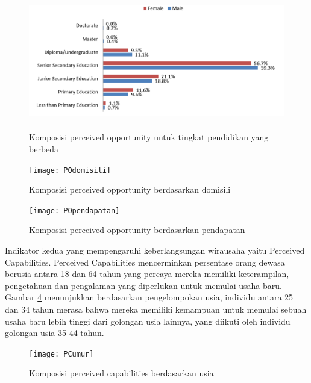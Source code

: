 \begin{figure} [H]
	\centering  
	\includegraphics[width=14cm, height=6cm]{POPendidikan} 
	\caption[Komposisi perceived opportunity untuk tingkat pendidikan yang berbeda] {Komposisi perceived opportunity untuk tingkat pendidikan yang berbeda} 
	\label{fig:POpendidikan} 
\end{figure}

\begin{figure} [H]
	\centering  
	\texttt{[image: POdomisili]} 
	\caption[Komposisi perceived opportunity berdasarkan domisili]{Komposisi perceived opportunity berdasarkan domisili} 
	\label{fig:POdomisili} 
\end{figure}

\begin{figure} [H]
	\centering  
	\texttt{[image: POpendapatan]} 
	\caption[Komposisi perceived opportunity berdasarkan pendapatan]{Komposisi perceived opportunity berdasarkan pendapatan} 
	\label{fig:POpendapatan} 
\end{figure}

Indikator kedua yang mempengaruhi keberlangsungan wirausaha yaitu Perceived Capabilities. Perceived Capabilities mencerminkan persentase orang dewasa berusia antara 18 dan 64 tahun yang percaya mereka memiliki keterampilan, pengetahuan dan pengalaman yang diperlukan untuk memulai usaha baru. Gambar \ref{fig:PCumur} menunjukkan berdasarkan pengelompokan usia, individu antara 25 dan 34 tahun merasa bahwa mereka memiliki kemampuan untuk memulai sebuah usaha baru lebih tinggi dari golongan usia lainnya, yang diikuti oleh individu golongan usia 35-44 tahun.

\begin{figure} [ht]
	\centering  
	\texttt{[image: PCumur]} 
	\caption[Komposisi perceived capabilities berdasarkan usia]{Komposisi perceived capabilities berdasarkan usia} 
	\label{fig:PCumur} 
\end{figure}

